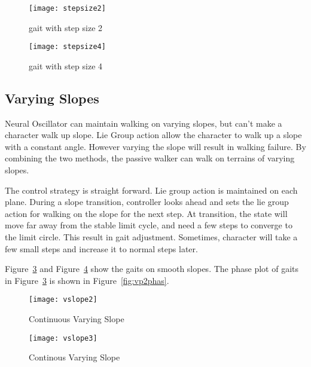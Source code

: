 \begin{figure}[!htbp]
  \begin{center}
      \texttt{[image: stepsize2]}
    \caption{gait with step size 2}
    \label{fig:ssp2}
\end{center}
\end{figure}

\begin{figure}[!htbp]
  \begin{center}
      \texttt{[image: stepsize4]}
    \caption{gait with step size 4}
    \label{fig:ssp3}
\end{center}
\end{figure}







\subsection{Varying Slopes}
Neural Oscillator can maintain walking on varying slopes, but can't make a character walk up slope.
Lie Group action allow the character to walk up a slope with a constant angle.
However varying the slope will result in walking failure.
By combining the two methods, the passive walker can walk on terrains of varying slopes.


The control strategy is straight forward.
Lie group action is maintained on each plane.
During a slope transition, controller looks ahead and sets the lie group action for  walking on the slope for the next step.
At transition, the state will move far away from the stable limit cycle, and need a few steps to converge to the limit circle.
This result in gait adjustment.
Sometimes, character will take a few small steps and increase it to normal steps later.


Figure~\ref{fig:vp1} and Figure~\ref{fig:vp2} show the gaits on smooth slopes.
The phase plot of gaits in Figure~\ref{fig:vp1} is shown in Figure~\ref{fig:vp2phas}.

\begin{figure}[!htbp]
  \begin{center}
      \texttt{[image: vslope2]}
    \caption{Continuous Varying Slope}
    \label{fig:vp1}
\end{center}
\end{figure}


\begin{figure}[!htbp]
  \begin{center}
      \texttt{[image: vslope3]}
    \caption{Continous Varying Slope}
    \label{fig:vp2}
\end{center}
\end{figure}


